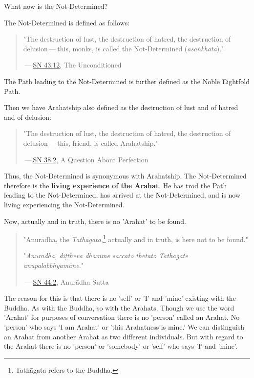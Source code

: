What now is the Not-Determined?


The Not-Determined is defined as follows:


\begin{quotation}
"The destruction of lust, the destruction of hatred, the destruction of
delusion — this, monks, is called the Not-Determined (\emph{asaṅkhata})."


 — \href{https://suttacentral.net/sn43.12/en/bodhi}{SN 43.12}, The Unconditioned


\end{quotation}

The Path leading to the Not-Determined is further defined as the
Noble Eightfold Path.


Then we have Arahatship also defined as the destruction of lust and of
hatred and of delusion:


\begin{quotation}
"The destruction of lust, the destruction of hatred, the destruction of
delusion — this, friend, is called Arahatship."


 — \href{https://suttacentral.net/sn38.2/en/sujato}{SN 38.2}, A Question About Perfection


\end{quotation}

\label{living-experience}Thus, the Not-Determined is synonymous with Arahatship. The
Not-Determined therefore is the \textbf{living experience of the Arahat}.
He has trod the Path leading to the Not-Determined, has arrived at
the Not-Determined, and is now living experiencing the Not-Determined.


Now, actually and in truth, there is no 'Arahat' to be found.


\begin{quotation}
"Anurādha, the \emph{Tathāgata},\footnote{Tathāgata refers to the Buddha.} actually
and in truth, is here not to be found."


"\emph{Anurādha, diṭṭheva dhamme saccato thetato Tathāgate anupalabbhyamāne.}"


 — \href{https://suttacentral.net/sn44.2/en/sujato}{SN 44.2}, Anurādha Sutta


\end{quotation}

The reason for this is that there
is no 'self' or 'I' and 'mine' existing with the Buddha. As with the
Buddha, so with the Arahats. Though we use the word 'Arahat' for
purposes of conversation there is no 'person' called an Arahat. No
'person' who says 'I am Arahat' or 'this Arahatness is mine.' We can
distinguish an Arahat from another Arahat as two different individuals.
But with regard to the Arahat there is no 'person' or 'somebody' or
'self' who says 'I' and 'mine'.


